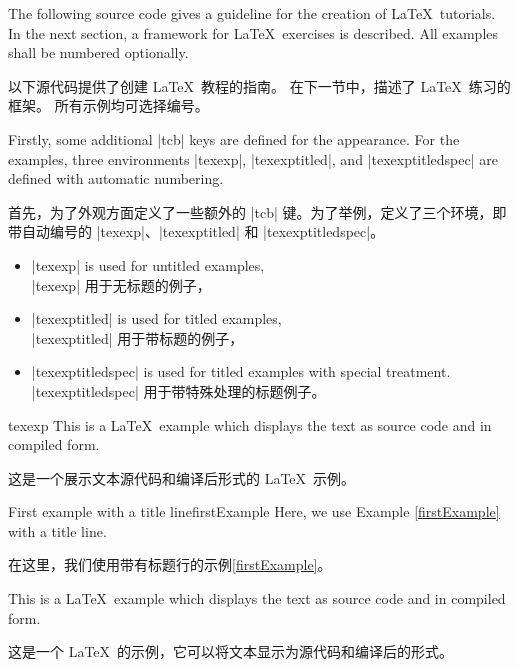 The following source code gives a guideline for the creation of \LaTeX\ tutorials.
In the next section, a framework for \LaTeX\ exercises is described.
All examples shall be numbered optionally.

以下源代码提供了创建 \LaTeX\ 教程的指南。 在下一节中，描述了 \LaTeX\ 练习的框架。 所有示例均可选择编号。

Firstly, some additional |tcb| keys are defined for the appearance.
For the examples, three environments |texexp|, |texexptitled|,
and |texexptitledspec| are defined with automatic numbering.

首先，为了外观方面定义了一些额外的 |tcb| 键。为了举例，定义了三个环境，即带自动编号的 |texexp|、|texexptitled| 和 |texexptitledspec|。
\begin{itemize}
\item |texexp| is used for untitled examples,
\\|texexp| 用于无标题的例子，
\item |texexptitled| is used for titled examples,
\\|texexptitled| 用于带标题的例子，
\item |texexptitledspec| is used for titled examples with special treatment.
\\|texexptitledspec| 用于带特殊处理的标题例子。
\end{itemize}


\begin{dispExample}
\begin{tcblisting}{texexp}
This is a \LaTeX\ example which displays the text as source code
and in compiled form.

这是一个展示文本源代码和编译后形式的 \LaTeX\ 示例。
\end{tcblisting}
\end{dispExample}


\begin{dispExample}
\begin{texexptitled}{First example with a title line}{firstExample}
Here, we use Example \ref{firstExample} with a title line.

在这里，我们使用带有标题行的示例\ref{firstExample}。
\end{texexptitled}
\end{dispExample}


\begin{dispExample}
\begin{texexp}{}
This is a \LaTeX\ example which displays the text as source code
and in compiled form.

这是一个 \LaTeX\ 的示例，它可以将文本显示为源代码和编译后的形式。
\end{texexp}
\end{dispExample}


